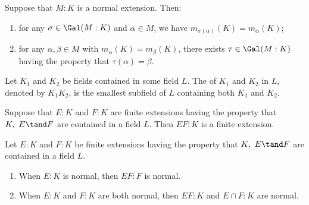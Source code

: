 \documentclass{article}
\begin{document}
  \begin{proposition}
    Suppose that $ M:K $ is a normal extension.
    Then: \begin{enumerate}[label=(\alph*)]
      \item for any $ \sigma\in\Gal(M:K) $ and $ \alpha\in M $, we have $ m_{\sigma(\alpha)}(K)=m_\alpha(K) $;
      \item for any $ \alpha,\beta\in M $ with $ m_\alpha(K)=m_\beta(K) $, there exists $ \tau\in\Gal(M:K) $ having the property that $ \tau(\alpha)=\beta $.
    \end{enumerate}
  \end{proposition}

  \begin{definition}[Compositum]
    Let $ K_1 $ and $ K_2 $ be fields contained in some field $ L $.
    The  of $ K_1 $ and $ K_2 $ in $ L $, denoted by $ K_1K_2 $, is the smallest subfield of $ L $ containing both $ K_1 $ and $ K_2 $.
  \end{definition}

  \begin{proposition}
    Suppose that $ E:K $ and $ F:K $ are finite extensions having the property that $ K,\ E\tand F $ are contained in a field $ L $.
    Then $ EF:K $ is a finite extension.
  \end{proposition}

  \begin{theorem}
    Let $ E:K $ and $ F:K $ be finite extensions having the property that $ K,\ E\tand F $ are contained in a field $ L $. \begin{enumerate}[label=(\alph*)]
      \item When $ E:K $ is normal, then $ EF:F $ is normal.
      \item When $ E:K $ and $ F:K $ are both normal, then $ EF:K $ and $ E\cap F:K $ are normal.
    \end{enumerate}
  \end{theorem}

\end{document}
